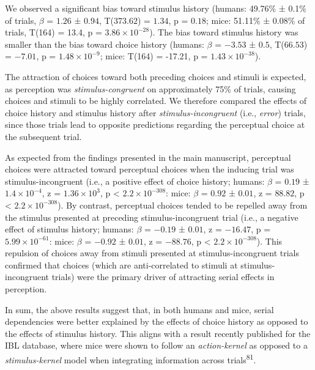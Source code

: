 \documentclass[
]{article}
\begin{document}
We observed a significant bias toward stimulus history (humans: 49.76\%
± 0.1\% of trials, \(\beta\) = \(1.26\) ± \(0.94\), T(\(373.62\)) =
\(1.34\), p = \(0.18\); mice: 51.11\% ± 0.08\% of trials, T(164) = 13.4,
p = \(\ensuremath{3.86\times 10^{-28}}\)). The bias toward stimulus
history was smaller than the bias toward choice history (humans:
\(\beta\) = \(-3.53\) ± \(0.5\), T(\(66.53\)) = \(-7.01\), p =
\(\ensuremath{1.48\times 10^{-9}}\); mice: T(164) = -17.21, p =
\(\ensuremath{1.43\times 10^{-38}}\)).

The attraction of choices toward both preceding choices and stimuli is
expected, as perception was \emph{stimulus-congruent} on approximately
75\% of trials, causing choices and stimuli to be highly correlated. We
therefore compared the effects of choice history and stimulus history
after \emph{stimulus-incongruent} (i.e., \emph{error}) trials, since
those trials lead to opposite predictions regarding the perceptual
choice at the subsequent trial.

As expected from the findings presented in the main manuscript,
perceptual choices were attracted toward perceptual choices when the
inducing trial was stimulus-incongruent (i.e., a positive effect of
choice history; humans: \(\beta\) = \(0.19\) ±
\(\ensuremath{1.4\times 10^{-4}}\), z =
\(\ensuremath{1.36\times 10^{3}}\), p < \(\ensuremath{2.2\times 10^{-308}}\): mice: \(\beta\) =
\(0.92\) ± \(0.01\), z = \(88.82\), p < \(\ensuremath{2.2\times 10^{-308}}\)). By contrast, perceptual
choices tended to be repelled away from the stimulus presented at
preceding stimulus-incongruent trial (i.e., a negative effect of
stimulus history; humans: \(\beta\) = \(-0.19\) ± \(0.01\), z =
\(-16.47\), p = \(\ensuremath{5.99\times 10^{-61}}\): mice: \(\beta\) =
\(-0.92\) ± \(0.01\), z = \(-88.76\), p < \(\ensuremath{2.2\times 10^{-308}}\)). This repulsion of
choices away from stimuli presented at stimulus-incongruent trials
confirmed that choices (which are anti-correlated to stimuli at
stimulus-incongruent trials) were the primary driver of attracting
serial effects in perception.

In sum, the above results suggest that, in both humans and mice, serial
dependencies were better explained by the effects of choice history as
opposed to the effects of stimulus history. This aligns with a result
recently published for the IBL database, where mice were shown to follow
an \emph{action-kernel} as opposed to a \emph{stimulus-kernel} model
when integrating information across trials\textsuperscript{81}.
\end{document}
